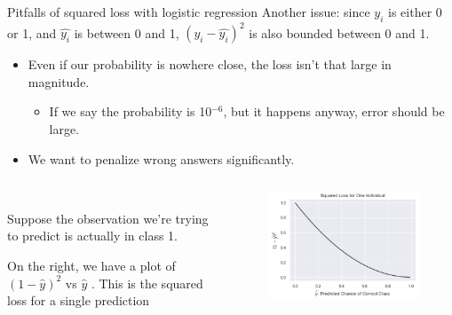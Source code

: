 \documentclass[aspectratio=169]{../latex_main/tntbeamer}  %
\begin{document}
	
	\begin{frame}{Pitfalls of squared loss with logistic regression}
        Another issue: since  $y_i$     is either 0 or 1, and   $\hat{y_i}$    is between 0 and 1,          $(y_i - \hat{y_i})^2$            is also bounded between 0 and 1.
        \begin{itemize}
            \item Even if our probability is nowhere close, the loss isn’t that large in magnitude.
            \begin{itemize}
                \item If we say the probability is 10$^{-6}$, but it happens anyway, error should be large.
            \end{itemize}
            \item We want to penalize wrong answers significantly.
        \end{itemize}
	    \begin{columns}
	        \begin{column}{.5\textwidth}
	                \\ \bigskip
	               Suppose the observation we're trying to predict is actually in class 1. \\
	               \bigskip
	               
	                On the right, we have a plot of     $(1 - \hat{y})^2$            vs $\hat{y}$      . This is the squared loss for a single prediction
	        \end{column}
	        
	        \begin{column}{.5\textwidth}
	                \begin{figure}
	                    \centering
	                    \includegraphics[scale=.55]{Bild17}
	                \end{figure}
	        \end{column}
	    \end{columns}
	\end{frame}
	
\end{document}
